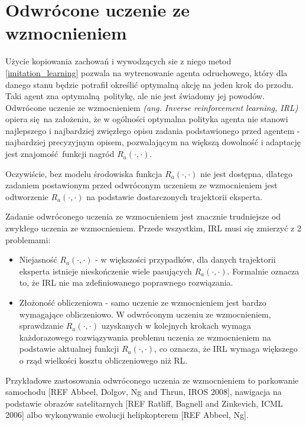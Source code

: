 \section{Odwrócone uczenie ze wzmocnieniem}
Użycie kopiowania zachowań i wywodzących sie z niego metod \ref{imitation_learning} pozwala na wytrenowanie agenta odruchowego, który dla danego stanu będzie potrafił określić optymalną akcję na jeden krok do przodu. Taki agent zna optymalną politykę, ale nie jest świadomy jej powodów. Odwrócone uczenie ze wzmocnieniem  \textit{(ang. Inverse reinforcement learning, IRL)} opiera się na założeniu, że w ogólności optymalna polityka agenta nie stanowi najlepszego i najbardziej zwięzłego opisu zadania podstawionego przed agentem - najbardziej precyzyjnym opisem, pozwalającym na większą dowolność i adaptację jest znajomość funkcji nagród $R_a(\cdot,\cdot)$.

Oczywiście, bez modelu środowiska funkcja $R_a(\cdot,\cdot)$ nie jest dostępna, dlatego zadaniem postawionym przed odwróconym uczeniem ze wzmocnieniem jest odtworzenie $R_a(\cdot,\cdot)$ na podstawie dostarczonych trajektorii eksperta.

Zadanie odwróconego uczenia ze wzmocnieniem jest znacznie trudniejsze od zwykłego uczenia ze wzmocnieniem. Przede wszystkim, IRL musi się zmierzyć z 2 problemami:

\begin{itemize}
\item Niejasność $R_a(\cdot,\cdot)$ - w większości przypadków, dla danych trajektorii eksperta istnieje nieskończenie wiele pasujących $R_a(\cdot,\cdot)$. Formalnie oznacza to, że IRL nie ma zdefiniowanego poprawnego rozwiązania.
\item Złożoność obliczeniowa - samo uczenie ze wzmocnieniem jest bardzo wymagające obliczeniowo. W odwróconym uczeniu ze wzmocnieniem, sprawdzanie $R_a(\cdot,\cdot)$ uzyskanych w kolejnych krokach wymaga każdorazowego rozwiązywania problemu uczenia ze wzmocnieniem na podstawie aktualnej funkcji $R_a(\cdot,\cdot)$, co oznacza, że IRL wymaga większego o rząd wielkości kosztu obliczeniowego niż RL.
\end{itemize}

Przykładowe zastosowania odwróconego uczenia ze wzmocnieniem to parkowanie samochodu [REF Abbeel, Dolgov, Ng and Thrun, IROS 2008], nawigacja na podstawie obrazów satelitarnych [REF Ratliff, Bagnell and Zinkevich, ICML 2006] albo wykonywanie ewolucji helipkopterem [REF Abbeel, Ng].



